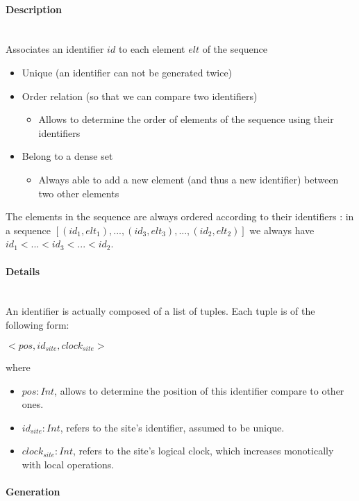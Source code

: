\documentclass[a4paper]{article}
\begin{document}
\paragraph{Description} ~\\

Associates an identifier $id$ to each element $elt$ of the sequence
\begin{itemize}
  \item Unique (an identifier can not be generated twice)
  \item Order relation (so that we can compare two identifiers)
  \begin{itemize}
    \item Allows to determine the order of elements of the sequence using their identifiers
  \end{itemize}
  \item Belong to a dense set
  \begin{itemize}
    \item Always able to add a new element (and thus a new identifier) between two other elements
  \end{itemize}
\end{itemize}

The elements in the sequence are always ordered according to their identifiers :
in a sequence $[(id_1, elt_1), ..., (id_3, elt_3), ..., (id_2, elt_2)]$
we always have $id_1 < ... < id_3 < ... < id_2$.

\paragraph{Details} ~\\

An identifier is actually composed of a list of tuples. Each tuple is of the following form:
\begin{center}
$<pos, id_{site}, clock_{site}>$
\end{center}
where
\begin{itemize}
  \item $pos: Int$, allows to determine the position of this identifier compare to other ones.
  \item $id_{site}: Int$, refers to the site's identifier, assumed to be unique.
  \item $clock_{site}: Int$, refers to the site's logical clock, which increases monotically with local operations.
\end{itemize}

\paragraph{Generation} ~\\
\end{document}
